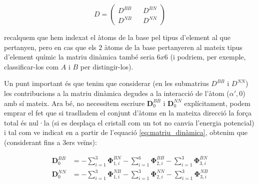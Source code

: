 \documentclass[12pt]{article} %
\let\vec\mathbf %
\begin{document}
{\begin{equation}
 \label{eq:formamatriudinamica}
 D=
 \begin{pmatrix}
  D^{BB} && D^{BN}\\
  D^{NB} && D^{NN}
 \end{pmatrix}
\end{equation}

recalquem que hem indexat el àtoms de la base pel tipus d'element al que pertanyen, pero en cas que els $2$ àtoms de la base pertanyeren al mateix tipus d'element químic la matriu dinàmica també seria $6x6$ (i podriem, per exemple, classificar-los com $A$ i $B$ per distingir-los).

Un punt important és que tenim que considerar (en les submatrius $D^{BB}$ i $D^{NN}$) les contribucions a la matriu dinàmica degudes a la interacció de l'àtom ($\alpha',0$) amb sí mateix. Ara bé, no necessitem escriure $\vec D_0^{BB}$ i $\vec D_0^{NN}$ explícitament, podem emprar el fet que si traslladem el conjunt d'àtoms en la mateixa direcció la força total és nul·la (si es desplaça el cristall com un tot no canvia l'energia potencial) i tal com ve indicat en \cite{falkovsky08_symmet_const_phonon_disper_graph} a partir de l'equació \ref{eq:matriu_dinàmica}, obtenim que (considerant fins a 3ers veïns):


\begin{equation}\begin{split}
\vec D_0^{BB}&=-\sum_{i=1}^3\vec \Phi_{1,i}^{BN}-\sum_{i=1}^6\vec \Phi_{2,i}^{BB}-\sum_{i=1}^3\vec \Phi_{3,i}^{BN} \\
\vec D_0^{NN}&=-\sum_{i=1}^3\vec \Phi_{1,i}^{NB}-\sum_{i=1}^3\vec \Phi_{2,i}^{NN}-\sum_{i=1}^3\vec \Phi_{3,i}^{NB}
\end{split}
\end{equation}


}
\end{document}
